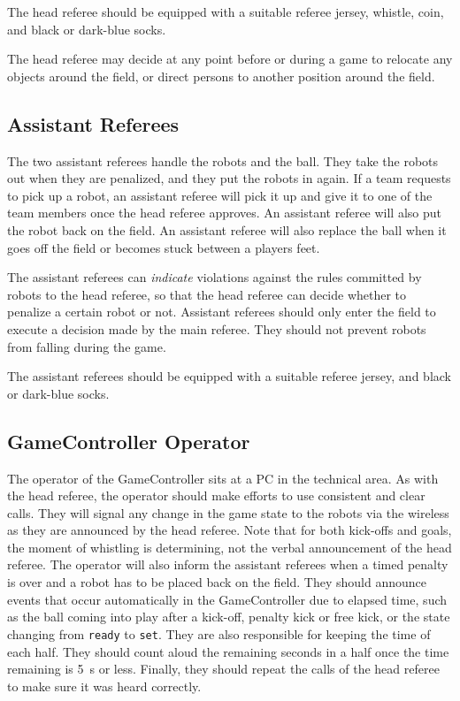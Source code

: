 The head referee should be equipped with a suitable referee jersey, whistle, coin, and black or dark-blue socks.

The head referee may decide at any point before or during a game to relocate any objects around the field, or direct persons to another position around the field.

\subsection{Assistant Referees}
\label{sec:assist_referee}

The two assistant referees handle the robots and the ball.
They take the robots out when they are penalized, and they put the robots in again.
If a team requests to pick up a robot, an assistant referee will pick it up and give it to one of the team members once the head referee approves.
An assistant referee will also put the robot back on the field.
An assistant referee will also replace the ball when it goes off the field or becomes stuck between a players feet.

The assistant referees can \textit{indicate} violations against the rules committed by robots to the head referee, so that the head referee can decide whether to penalize a certain robot or not.
Assistant referees should only enter the field to execute a decision made by the main referee.
They should not prevent robots from falling during the game.

The assistant referees should be equipped with a suitable referee jersey, and black or dark-blue socks.

\subsection{GameController Operator}
\label{sec:gameControllerOp}

The operator of the GameController sits at a PC in the technical area.
As with the head referee, the operator should make efforts to use consistent and clear calls.
They will signal any change in the game state to the robots via the wireless as they are announced by the head referee.
Note that for both kick-offs and goals, the moment of whistling is determining, not the verbal announcement of the head referee.
The operator will also inform the assistant referees when a timed penalty is over and a robot has to be placed back on the field.
They should announce events that occur automatically in the GameController due to elapsed time, such as the ball coming into play after a kick-off, penalty kick or free kick, or the state changing from \texttt{ready} to \texttt{set}.
They are also responsible for keeping the time of each half.
They should count aloud the remaining seconds in a half once the time remaining is \qty{5}{\second} or less.
Finally, they should repeat the calls of the head referee to make sure it was heard correctly.

